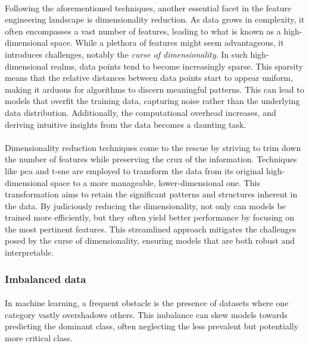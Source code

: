         \paragraph{}Following the aforementioned techniques, another essential facet in the feature engineering landscape is dimensionality reduction. As data grows in complexity, it often encompasses a vast number of features, leading to what is known as a high-dimensional space. While a plethora of features might seem advantageous, it introduces challenges, notably the \textit{curse of dimensionality}\cite{hutchison_curse_2005, koppen_curse_2000}. In such high-dimensional realms, data points tend to become increasingly sparse. This sparsity means that the relative distances between data points start to appear uniform, making it arduous for algorithms to discern meaningful patterns. This can lead to models that overfit the training data, capturing noise rather than the underlying data distribution. Additionally, the computational overhead increases, and deriving intuitive insights from the data becomes a daunting task.

        \paragraph{}Dimensionality reduction techniques come to the rescue by striving to trim down the number of features while preserving the crux of the information. Techniques like \acrfull{pca} and \acrfull{t-sne} are employed to transform the data from its original high-dimensional space to a more manageable, lower-dimensional one. This transformation aims to retain the significant patterns and structures inherent in the data. By judiciously reducing the dimensionality, not only can models be trained more efficiently, but they often yield better performance by focusing on the most pertinent features. This streamlined approach mitigates the challenges posed by the curse of dimensionality, ensuring models that are both robust and interpretable.

    \subsubsection{Imbalanced data}\label{seq:background:imbalanced_data}
        \paragraph{}In machine learning, a frequent obstacle is the presence of datasets where one category vastly overshadows others\cite{ramyachitra_imbalanced_2014}. This imbalance can skew models towards predicting the dominant class, often neglecting the less prevalent but potentially more critical class.

